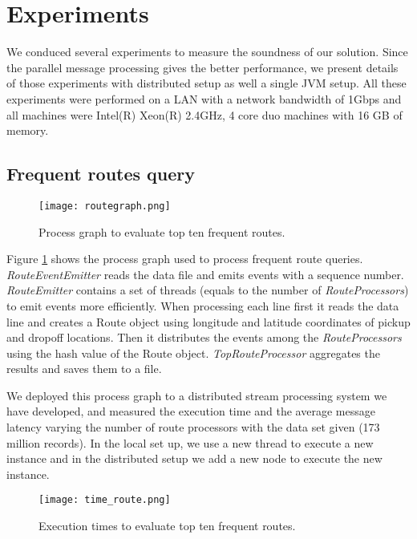 \section{Experiments}
We conduced several experiments to measure the soundness of our solution. Since the parallel message processing gives the better performance, we present details of those experiments with distributed setup as well a single JVM setup. All these experiments were performed on a LAN with a network bandwidth of 1Gbps and all machines were Intel(R) Xeon(R) 2.4GHz, 4 core duo machines with 16 GB of memory. 

\subsection{Frequent routes query}

\begin{figure}[!t]
        \centering
        \texttt{[image: routegraph.png]}
        \caption{Process graph to evaluate top ten frequent routes.}
        \label{routegraph}
\end{figure}

Figure \ref{routegraph} shows the process graph used to process frequent route queries. \textit{RouteEventEmitter} reads the data file and emits events with a sequence number. \textit{RouteEmitter} contains a set of threads (equals to the number of \textit{RouteProcessors}) to emit events more efficiently. When processing each line first it reads the data line and creates a Route object using longitude and latitude coordinates of pickup and dropoff locations. Then it distributes the events among the \textit{RouteProcessors} using the hash value of the Route object. \textit{TopRouteProcessor} aggregates the results and saves them to a file.

We deployed this process graph to a distributed stream processing system we have developed, and  measured the execution time and the average message latency varying the number of route processors with the data set given (173 million records). In the local set up, we use a new thread to execute a new instance and in the distributed setup we add a new node to execute the new instance.

\begin{figure}[!t]
        \centering
        \texttt{[image: time\_route.png]}
        \caption{Execution times to evaluate top ten frequent routes.}
        \label{time_route}
\end{figure}
 

